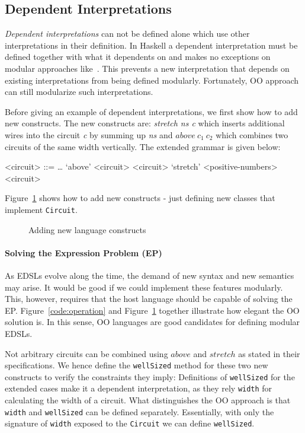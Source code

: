 \subsection{Dependent Interpretations}
 \emph{Dependent interpretations} can not be defined alone which use other
 interpretations in their definition.
In Haskell a dependent interpretation must be defined together with what it
dependents on and makes no exceptions on modular approaches like~\cite{}.
This prevents a new interpretation that depends on existing
interpretations from being defined modularly.
Fortunately, OO approach can still modularize such interpretations.

Before giving an example of dependent interpretations, we first show how to add new
constructs. The new constructs are: \emph{stretch ns c} which inserts additional wires into the circuit \emph{c} by
summing up \emph{ns} and $above\ c_1\ c_2$ which combines two circuits of the same width vertically.
\setlength{\grammarindent}{5em} %
The extended grammar is given below:
\begin{grammar}
<circuit> ::= \ldots
\alt `above' <circuit> <circuit>
\alt `stretch' <positive-numbers> <circuit>
\end{grammar}

Figure~\ref{code:variant} shows how to add new constructs - just defining new classes that implement \lstinline{Circuit}.
\begin{figure}
\caption{Adding new language constructs}
\label{code:variant}
\end{figure}
\paragraph{Solving the Expression Problem (EP)} As EDSLs evolve along the time, the
demand of new syntax and new semantics may arise. It would be good if we could
implement these features modularly. This, however, requires that the host
language should be capable of solving the EP. Figure~\ref{code:operation} and
Figure~\ref{code:variant} together illustrate how elegant the OO solution is.
In this sense, OO languages are good candidates for defining modular EDSLs.

Not arbitrary circuits can be combined using $above$ and $stretch$
as stated in their specifications.
We hence define the \lstinline{wellSized} method for these two new constructs to
verify the constraints they imply:
Definitions of \lstinline{wellSized} for the extended cases make it a dependent interpretation, as they
rely \lstinline{width} for calculating the width of a circuit.
What distinguishes the OO approach is that \lstinline{width} and \lstinline{wellSized}
can be defined separately. Essentially, with only the signature of
\lstinline{width} exposed to the \lstinline{Circuit} we can
define \lstinline{wellSized}.

